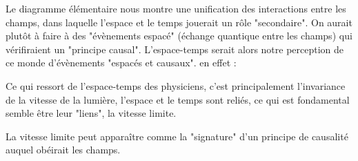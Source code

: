 Le diagramme élémentaire nous montre une unification des interactions entre les champs, dans laquelle l'espace et le temps jouerait un rôle "secondaire". On aurait plutôt à faire à des "évènements espacé" (échange quantique entre les champs) qui vérifiraient un "principe causal". L'espace-temps serait alors notre perception de ce monde d'évènements "espacés et causaux". en effet :

Ce qui ressort de l'espace-temps des physiciens, c'est principalement l'invariance de la vitesse de la lumière, l'espace et le temps sont reliés, ce qui est fondamental semble être leur "liens", la vitesse limite.

La vitesse limite peut apparaître comme la "signature" d'un principe de causalité auquel obéirait les champs.
